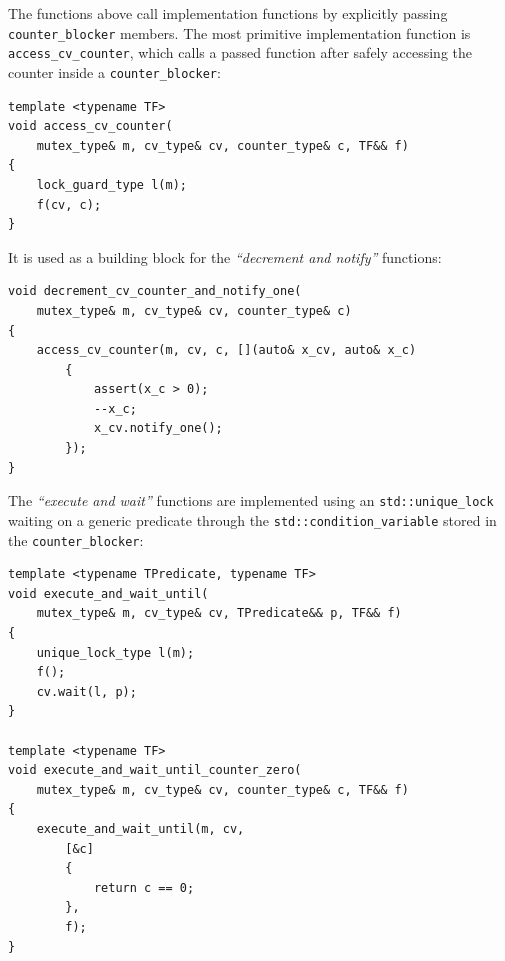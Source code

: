 \documentclass[twoside, 12pt, a4paper, openright]{book}
\begin{document}
The functions above call implementation functions by explicitly passing
\texttt{counter_blocker}
members. The most primitive implementation function is
\texttt{access_cv_counter},
which calls a passed function after safely accessing the counter inside
a
\texttt{counter_blocker}:

\begin{verbatim}
template <typename TF>
void access_cv_counter(
    mutex_type& m, cv_type& cv, counter_type& c, TF&& f)
{
    lock_guard_type l(m);
    f(cv, c);
}
\end{verbatim}

It is used as a building block for the \emph{``decrement and notify''}
functions:

\begin{verbatim}
void decrement_cv_counter_and_notify_one(
    mutex_type& m, cv_type& cv, counter_type& c)
{
    access_cv_counter(m, cv, c, [](auto& x_cv, auto& x_c)
        {
            assert(x_c > 0);
            --x_c;
            x_cv.notify_one();
        });
}
\end{verbatim}

The \emph{``execute and wait''} functions are implemented using an
\texttt{std::unique_lock}
waiting on a generic predicate through the
\texttt{std::condition_variable}
stored in the
\texttt{counter_blocker}:

\begin{verbatim}
template <typename TPredicate, typename TF>
void execute_and_wait_until(
    mutex_type& m, cv_type& cv, TPredicate&& p, TF&& f)
{
    unique_lock_type l(m);
    f();
    cv.wait(l, p);
}

template <typename TF>
void execute_and_wait_until_counter_zero(
    mutex_type& m, cv_type& cv, counter_type& c, TF&& f)
{
    execute_and_wait_until(m, cv,
        [&c]
        {
            return c == 0;
        },
        f);
}
\end{verbatim}
\end{document}
